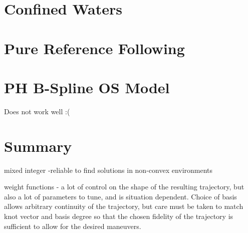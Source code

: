 \section{Confined Waters}


\section{Pure Reference Following}


\section{PH B-Spline OS Model}
Does not work well :(

\section{Summary}

mixed integer -reliable to find solutions in non-convex environments

weight functions - a lot of control on the shape of the resulting trajectory, but also a lot of parameters to tune, and is situation dependent. Choice of basis allows arbitrary continuity of the trajectory, but care must be taken to match knot vector and basis degree so that the chosen fidelity of the trajectory is sufficient to allow for the desired maneuvers.